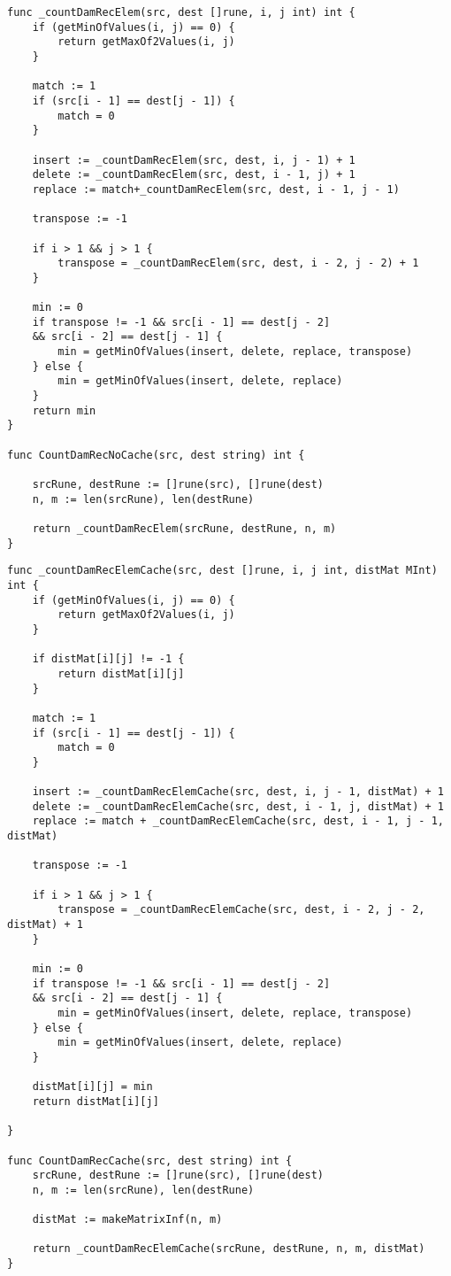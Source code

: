 \begin{lstlisting}[label=damer-lev-iter,caption=Программный код нахождения расстояния Дамерау\,--\,Левенштейна рекурсивно]
func _countDamRecElem(src, dest []rune, i, j int) int {
	if (getMinOfValues(i, j) == 0) {
		return getMaxOf2Values(i, j)
	}
	
	match := 1
	if (src[i - 1] == dest[j - 1]) {
		match = 0
	}
	
	insert := _countDamRecElem(src, dest, i, j - 1) + 1
	delete := _countDamRecElem(src, dest, i - 1, j) + 1
	replace := match+_countDamRecElem(src, dest, i - 1, j - 1)
	
	transpose := -1
	
	if i > 1 && j > 1 {
		transpose = _countDamRecElem(src, dest, i - 2, j - 2) + 1
	}
	
	min := 0
	if transpose != -1 && src[i - 1] == dest[j - 2] 
	&& src[i - 2] == dest[j - 1] {
		min = getMinOfValues(insert, delete, replace, transpose)
	} else {
		min = getMinOfValues(insert, delete, replace)
	}
	return min
}

func CountDamRecNoCache(src, dest string) int {
	
	srcRune, destRune := []rune(src), []rune(dest)
	n, m := len(srcRune), len(destRune)
	
	return _countDamRecElem(srcRune, destRune, n, m)
}
\end{lstlisting}

\begin{lstlisting}[label=damer-lev-rec,caption=Программный код нахождения расстояния Дамерау\,--\,Левенштейна рекурсивно с кэшем]	
func _countDamRecElemCache(src, dest []rune, i, j int, distMat MInt) int {
	if (getMinOfValues(i, j) == 0) {
		return getMaxOf2Values(i, j)
	}
	
	if distMat[i][j] != -1 {
		return distMat[i][j]
	}
	
	match := 1
	if (src[i - 1] == dest[j - 1]) {
		match = 0
	}
	
	insert := _countDamRecElemCache(src, dest, i, j - 1, distMat) + 1
	delete := _countDamRecElemCache(src, dest, i - 1, j, distMat) + 1
	replace := match + _countDamRecElemCache(src, dest, i - 1, j - 1, distMat)
	
	transpose := -1
	
	if i > 1 && j > 1 {
		transpose = _countDamRecElemCache(src, dest, i - 2, j - 2, distMat) + 1
	}
	
	min := 0
	if transpose != -1 && src[i - 1] == dest[j - 2] 
	&& src[i - 2] == dest[j - 1] {
		min = getMinOfValues(insert, delete, replace, transpose)
	} else {
		min = getMinOfValues(insert, delete, replace)
	}
	
	distMat[i][j] = min
	return distMat[i][j]
	
}

func CountDamRecCache(src, dest string) int {
	srcRune, destRune := []rune(src), []rune(dest)
	n, m := len(srcRune), len(destRune)
	
	distMat := makeMatrixInf(n, m)
	
	return _countDamRecElemCache(srcRune, destRune, n, m, distMat)
}
\end{lstlisting}

